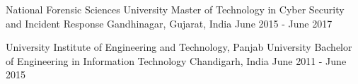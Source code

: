 

\begin{cventries}

  \cventry
    {National Forensic Sciences University} %
    {Master of Technology in Cyber Security and Incident Response} %
    {Gandhinagar, Gujarat, India} %
    {June 2015 - June 2017} %
    {
    }

    \cventry
    {University Institute of Engineering and
    Technology, Panjab University} %
    {Bachelor of Engineering in Information Technology} %
    {Chandigarh, India} %
    {June 2011 - June 2015} %
    {
    }

\end{cventries}
